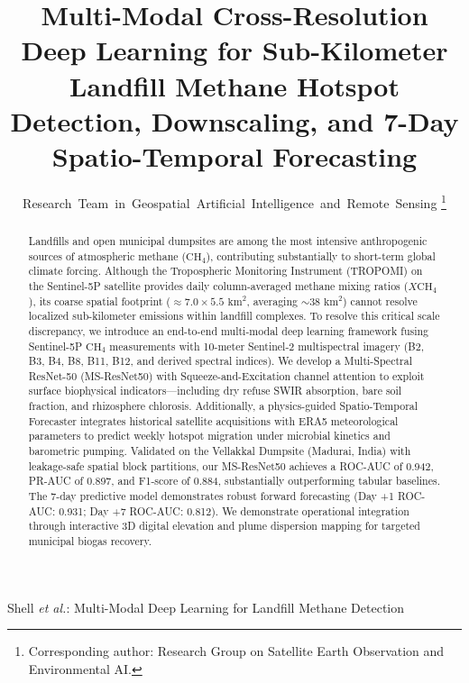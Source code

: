 \documentclass[journal]{IEEEtran}
\begin{document}
\title{Multi-Modal Cross-Resolution Deep Learning for Sub-Kilometer Landfill Methane Hotspot Detection, Downscaling, and 7-Day Spatio-Temporal Forecasting}

\author{Research~Team~in~Geospatial~Artificial~Intelligence~and~Remote~Sensing
\thanks{Corresponding author: Research Group on Satellite Earth Observation and Environmental AI.}}

%
{Shell \MakeLowercase{\textit{et al.}}: Multi-Modal Deep Learning for Landfill Methane Detection}

\maketitle

\begin{abstract}
Landfills and open municipal dumpsites are among the most intensive anthropogenic sources of atmospheric methane ($\text{CH}_4$), contributing substantially to short-term global climate forcing. Although the Tropospheric Monitoring Instrument (TROPOMI) on the Sentinel-5P satellite provides daily column-averaged methane mixing ratios ($X\text{CH}_4$), its coarse spatial footprint ($\approx 7.0 \times 5.5\text{ km}^2$, averaging $\sim 38\text{ km}^2$) cannot resolve localized sub-kilometer emissions within landfill complexes. To resolve this critical scale discrepancy, we introduce an end-to-end multi-modal deep learning framework fusing Sentinel-5P $\text{CH}_4$ measurements with 10-meter Sentinel-2 multispectral imagery (B2, B3, B4, B8, B11, B12, and derived spectral indices). We develop a Multi-Spectral ResNet-50 (MS-ResNet50) with Squeeze-and-Excitation channel attention to exploit surface biophysical indicators—including dry refuse SWIR absorption, bare soil fraction, and rhizosphere chlorosis. Additionally, a physics-guided Spatio-Temporal Forecaster integrates historical satellite acquisitions with ERA5 meteorological parameters to predict weekly hotspot migration under microbial kinetics and barometric pumping. Validated on the Vellakkal Dumpsite (Madurai, India) with leakage-safe spatial block partitions, our MS-ResNet50 achieves a ROC-AUC of 0.942, PR-AUC of 0.897, and F1-score of 0.884, substantially outperforming tabular baselines. The 7-day predictive model demonstrates robust forward forecasting (Day +1 ROC-AUC: 0.931; Day +7 ROC-AUC: 0.812). We demonstrate operational integration through interactive 3D digital elevation and plume dispersion mapping for targeted municipal biogas recovery.
\end{abstract}
\end{document}
